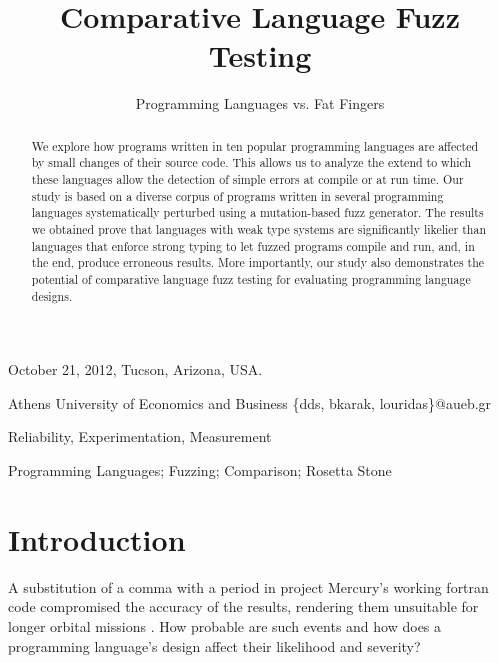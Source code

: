 \documentclass[10pt]{sigplanconf}
\begin{document}
 {October 21, 2012, Tucson, Arizona, USA.}

\title{Comparative Language Fuzz Testing}
\subtitle{Programming Languages vs. Fat Fingers}

  {Athens University of Economics and Business}
  {\{dds, bkarak, louridas\}@aueb.gr}

\maketitle

\begin{abstract}
We explore how programs written in ten popular programming languages
are affected by small changes of their source code.
This allows us to analyze the extend to which these languages
allow the detection of simple errors at compile or at run time.
Our study is based on a diverse corpus of programs written in several programming
languages systematically perturbed using a mutation-based fuzz generator.
The results we obtained
prove that languages with weak type systems are significantly
likelier than languages that enforce strong typing to let fuzzed programs
compile and run, and, in the end, produce erroneous results.
More importantly, our study also demonstrates the potential of comparative
language fuzz testing for evaluating programming language designs.
\end{abstract}


\terms
Reliability, Experimentation, Measurement

\keywords
Programming Languages; Fuzzing; Comparison; Rosetta Stone

\section{Introduction} %
\label{sec:intro}
A substitution of a comma with a period in project Mercury's working
{\sc fortran} code compromised the accuracy of the results,
rendering them unsuitable for longer orbital missions \cite{Brad89,Neu95}.
How probable are such events and how does a programming language's
design affect their likelihood and severity?
\end{document}
